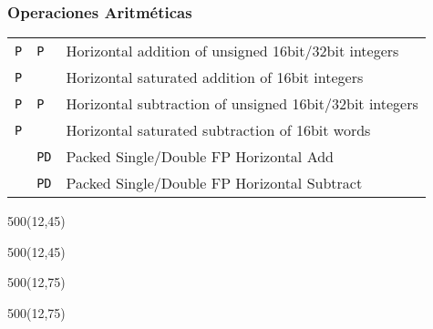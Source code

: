 \documentclass[aspectratio=169]{beamer}
\begin{document}

\begin{frame}[fragile,t]
    \frametitle{Operaciones Aritméticas}
    \begin{center}
    \begin{tabular}{ll|l}
    \hline
    \texttt{P\color{y}{H}\color{black}{ADD}\color{v}{W}}             & \texttt{P\color{y}{H}\color{black}{ADD}\color{v}{D}} & Horizontal addition of unsigned 16bit/32bit integers \\
    \texttt{P\color{y}{H}\color{black}{ADD}\color{v}{S}\color{v}{W}} &                                                      & Horizontal saturated addition of 16bit integers \\
    \texttt{P\color{y}{H}\color{black}{SUB}\color{v}{W}}             & \texttt{P\color{y}{H}\color{black}{SUB}\color{v}{D}} & Horizontal subtraction of unsigned 16bit/32bit integers \\
    \texttt{P\color{y}{H}\color{black}{SUB}\color{v}{S}\color{v}{W}} &                                                      & Horizontal saturated subtraction of 16bit words \\
    \hline
    \texttt{\color{y}{H}\color{black}{ADD}\color{v}{PS}}             & \texttt{\color{y}{H}\color{black}{ADD}\color{v}PD}   & Packed Single/Double FP Horizontal Add \\
    \texttt{\color{y}{H}\color{black}{SUB}\color{v}{PS}}             & \texttt{\color{y}{H}\color{black}{SUB}\color{v}PD}   & Packed Single/Double FP Horizontal Subtract \\
    \hline
    \end{tabular}
    \end{center}
\begin{textblock}{500}(12,45)  \end{textblock}
\begin{textblock}{500}(12,45)  \end{textblock}
\begin{textblock}{500}(12,75)  \end{textblock}
\begin{textblock}{500}(12,75)  \end{textblock}
\end{frame}
\end{document}
